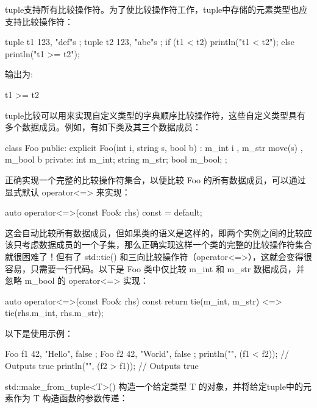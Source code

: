 
tuple支持所有比较操作符。为了使比较操作符工作，tuple中存储的元素类型也应支持比较操作符：

\begin{cpp}
tuple t1 { 123, "def"s };
tuple t2 { 123, "abc"s };
if (t1 < t2) { println("t1 < t2"); }
else { println("t1 >= t2"); }
\end{cpp}

输出为:

\begin{shell}
t1 >= t2
\end{shell}

tuple比较可以用来实现自定义类型的字典顺序比较操作符，这些自定义类型具有多个数据成员。例如，有如下类及其三个数据成员：

\begin{cpp}
class Foo
{
    public:
        explicit Foo(int i, string s, bool b)
            : m_int { i }, m_str { move(s) }, m_bool { b } { }
    private:
        int m_int;
        string m_str;
        bool m_bool;
};
\end{cpp}

正确实现一个完整的比较操作符集合，以便比较 Foo 的所有数据成员，可以通过显式默认 operator<=> 来实现：

\begin{cpp}
auto operator<=>(const Foo& rhs) const = default;
\end{cpp}

这会自动比较所有数据成员，但如果类的语义是这样的，即两个实例之间的比较应该只考虑数据成员的一个子集，那么正确实现这样一个类的完整的比较操作符集合就很困难了！但有了 std::tie() 和三向比较操作符（operator<=>），这就会变得很容易，只需要一行代码。以下是 Foo 类中仅比较 m\_int 和 m\_str 数据成员，并忽略 m\_bool 的 operator<=> 实现：

\begin{cpp}
auto operator<=>(const Foo& rhs) const
{
    return tie(m_int, m_str) <=> tie(rhs.m_int, rhs.m_str);
}
\end{cpp}

以下是使用示例：

\begin{cpp}
Foo f1 { 42, "Hello", false };
Foo f2 { 42, "World", false };
println("{}", (f1 < f2)); // Outputs true
println("{}", (f2 > f1)); // Outputs true
\end{cpp}


std::make\_from\_tuple<T>() 构造一个给定类型 T 的对象，并将给定tuple中的元素作为 T 构造函数的参数传递：

